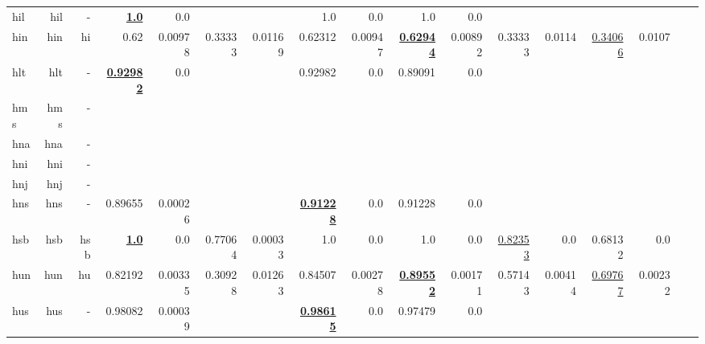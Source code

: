 \documentclass[11pt]{article}
\begin{document}
\begin{table*}[h]
{\begin{tabular}{lrrrrrrrrrrrrrrrr}
hil         & hil         & -         & \textbf{\underline{1.0}}         & 0.0         &          &          & 1.0         & 0.0         & 1.0         & 0.0         &          &          &          &          \\
hin         & hin         & hi         & 0.62         & 0.00978         & 0.33333         & 0.01169         & 0.62312         & 0.00947         & \textbf{\underline{0.62944}}         & 0.00892         & 0.33333         & 0.0114         & \underline{0.34066}         & 0.0107         \\
hlt         & hlt         & -         & \textbf{\underline{0.92982}}         & 0.0         &          &          & 0.92982         & 0.0         & 0.89091         & 0.0         &          &          &          &          \\
hms         & hms         & -         &          &          &          &          &          &          &          &          &          &          &          &          \\
hna         & hna         & -         &          &          &          &          &          &          &          &          &          &          &          &          \\
hni         & hni         & -         &          &          &          &          &          &          &          &          &          &          &          &          \\
hnj         & hnj         & -         &          &          &          &          &          &          &          &          &          &          &          &          \\
hns         & hns         & -         & 0.89655         & 0.00026         &          &          & \textbf{\underline{0.91228}}         & 0.0         & 0.91228         & 0.0         &          &          &          &          \\
hsb         & hsb         & hsb         & \textbf{\underline{1.0}}         & 0.0         & 0.77064         & 0.00033         & 1.0         & 0.0         & 1.0         & 0.0         & \underline{0.82353}         & 0.0         & 0.68132         & 0.0         \\
hun         & hun         & hu         & 0.82192         & 0.00335         & 0.30928         & 0.01263         & 0.84507         & 0.00278         & \textbf{\underline{0.89552}}         & 0.00171         & 0.57143         & 0.00414         & \underline{0.69767}         & 0.00232         \\
hus         & hus         & -         & 0.98082         & 0.00039         &          &          & \textbf{\underline{0.98615}}         & 0.0         & 0.97479         & 0.0         &          &          &          &          \\

\end{tabular}}
\end{table*}
\end{document}
